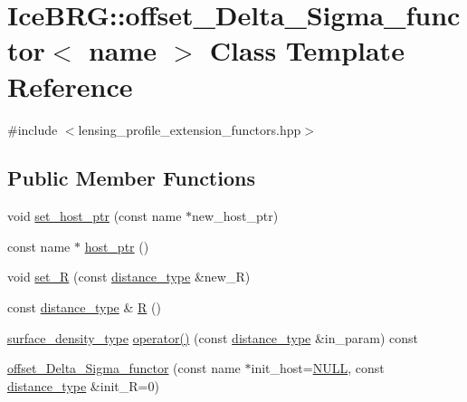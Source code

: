 \hypertarget{classIceBRG_1_1offset__Delta__Sigma__functor}{}\section{Ice\+B\+R\+G\+:\+:offset\+\_\+\+Delta\+\_\+\+Sigma\+\_\+functor$<$ name $>$ Class Template Reference}
\label{classIceBRG_1_1offset__Delta__Sigma__functor}


{\ttfamily \#include $<$lensing\+\_\+profile\+\_\+extension\+\_\+functors.\+hpp$>$}

\subsection*{Public Member Functions}
\begin{DoxyCompactItemize}
\item 
void \hyperlink{classIceBRG_1_1offset__Delta__Sigma__functor_aa4be0b3f2d504a8e1f99dd20ab87d656}{set\+\_\+host\+\_\+ptr} (const name $\ast$new\+\_\+host\+\_\+ptr)
\item 
const name $\ast$ \hyperlink{classIceBRG_1_1offset__Delta__Sigma__functor_a7179cc58e43c2aa8a5396e9587494f07}{host\+\_\+ptr} ()
\item 
void \hyperlink{classIceBRG_1_1offset__Delta__Sigma__functor_aed929b1761fd7089fcf317ed23f91a08}{set\+\_\+\+R} (const \hyperlink{namespaceIceBRG_a45499647eb87e24c10ab32c628711cec}{distance\+\_\+type} \&new\+\_\+\+R)
\item 
const \hyperlink{namespaceIceBRG_a45499647eb87e24c10ab32c628711cec}{distance\+\_\+type} \& \hyperlink{classIceBRG_1_1offset__Delta__Sigma__functor_a000cbceadda70237df9fd0d50a8c470f}{R} ()
\item 
\hyperlink{namespaceIceBRG_a80c597ef5ba0a32491d32a9f0083b02d}{surface\+\_\+density\+\_\+type} \hyperlink{classIceBRG_1_1offset__Delta__Sigma__functor_a1f55fab2442343aabbeed1905fd82a0c}{operator()} (const \hyperlink{namespaceIceBRG_a45499647eb87e24c10ab32c628711cec}{distance\+\_\+type} \&in\+\_\+param) const 
\item 
\hyperlink{classIceBRG_1_1offset__Delta__Sigma__functor_adf29297b922726aeb9a29754ed367a49}{offset\+\_\+\+Delta\+\_\+\+Sigma\+\_\+functor} (const name $\ast$init\+\_\+host=\hyperlink{lib_2IceBRG__main_2common_8h_a070d2ce7b6bb7e5c05602aa8c308d0c4}{N\+U\+L\+L}, const \hyperlink{namespaceIceBRG_a45499647eb87e24c10ab32c628711cec}{distance\+\_\+type} \&init\+\_\+\+R=0)
\end{DoxyCompactItemize}


